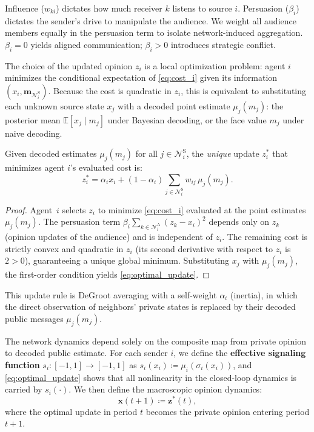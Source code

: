 \documentclass[journal,twoside,web]{ieeecolor}
\begin{document}
\begin{remark}
    \label{rem:weighted_influence}    Influence ($w_{ki}$) dictates how much receiver $k$ listens to source $i$. Persuasion ($\beta_i$) dictates the sender's drive to manipulate the audience. We weight all audience members equally in the persuasion term to isolate network-induced aggregation. $\beta_i = 0$ yields aligned communication; $\beta_i > 0$ introduces strategic conflict.
\end{remark}

The choice of the updated opinion $z_i$ is a local optimization problem: agent $i$ minimizes the conditional expectation of \eqref{eq:cost_i} given its information $(x_i, \bm{m}_{\mathcal{N}_i^{\mathrm{S}}})$. Because the cost is quadratic in $z_i$, this is equivalent to substituting each unknown source state $x_j$ with a decoded point estimate $\mu_j(m_j)$: the posterior mean $\mathbb{E}[x_j \mid m_j]$ under Bayesian decoding, or the face value $m_j$ under naive decoding.

\begin{proposition}
    \label{prop:optimal_update}
    Given decoded estimates $\mu_j(m_j)$ for all $j\in\mathcal N_i^{\mathrm S}$, the \emph{unique} update $z_i^*$ that minimizes agent $i$'s evaluated cost is:
    \begin{equation}
        \label{eq:optimal_update}
        z_i^{*}=\alpha_i x_i+(1-\alpha_i)\sum_{j \in\mathcal{N}_i^{\mathrm{S}}} w_{ij}\,\mu_j(m_j).
    \end{equation}
\end{proposition}
\begin{proof}
    Agent~$i$ selects $z_i$ to minimize \eqref{eq:cost_i} evaluated at the point estimates $\mu_j(m_j)$. The persuasion term $\beta_i\sum_{k \in \mathcal{N}_i^{\mathrm{A}}}(z_k-x_i)^2$ depends only on $z_k$ (opinion updates of the audience) and is independent of $z_i$. The remaining cost is strictly convex and quadratic in $z_i$ (its second derivative with respect to $z_i$ is $2 > 0$), guaranteeing a unique global minimum. Substituting $x_j$ with $\mu_j(m_j)$, the first-order condition
    yields \eqref{eq:optimal_update}.
\end{proof}
This update rule is DeGroot averaging with a self-weight $\alpha_i$ (inertia), in which the direct observation of neighbors' private states is replaced by their decoded public messages $\mu_j(m_j)$.

The network dynamics depend solely on the composite map from private opinion to decoded public estimate.
For each sender $i$, we define the \textbf{effective signaling function} $s_i : [-1,1] \to [-1,1]$ as $  s_i(x_i) \coloneqq \mu_i(\sigma_i(x_i))$,
and \eqref{eq:optimal_update} shows that all nonlinearity in the closed-loop dynamics is carried by $s_i(\cdot)$.
We then define the macroscopic opinion dynamics:
\begin{equation}
    \label{eq:opinion_update}
    \bm{x}(t+1) \coloneqq \bm{z}^*(t),
\end{equation}
where the optimal update in period $t$ becomes the private opinion entering period $t+1$.
\end{document}
